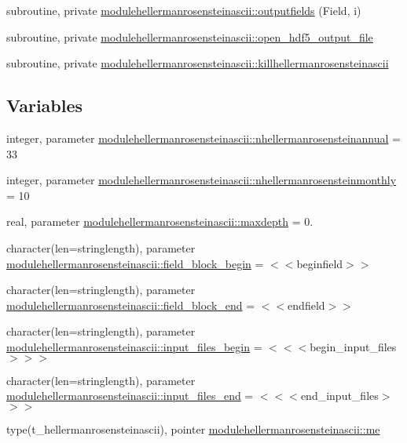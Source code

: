 \begin{DoxyCompactItemize}
\item 
subroutine, private \mbox{\hyperlink{namespacemodulehellermanrosensteinascii_ab76e43d5b0134daf9106f606a088cbea}{modulehellermanrosensteinascii\+::outputfields}} (Field, i)
\item 
subroutine, private \mbox{\hyperlink{namespacemodulehellermanrosensteinascii_a7fa8f1b341c583ddb13cecd1d05b9e77}{modulehellermanrosensteinascii\+::open\+\_\+hdf5\+\_\+output\+\_\+file}}
\item 
subroutine, private \mbox{\hyperlink{namespacemodulehellermanrosensteinascii_a2350c23791f119cd18bfa9a4e532508c}{modulehellermanrosensteinascii\+::killhellermanrosensteinascii}}
\end{DoxyCompactItemize}
\subsection*{Variables}
\begin{DoxyCompactItemize}
\item 
integer, parameter \mbox{\hyperlink{namespacemodulehellermanrosensteinascii_a7c99a3c54379548ef0084208ccd395ed}{modulehellermanrosensteinascii\+::nhellermanrosensteinannual}} = 33
\item 
integer, parameter \mbox{\hyperlink{namespacemodulehellermanrosensteinascii_adc90d7846e6bfeced43dc1391d5e90aa}{modulehellermanrosensteinascii\+::nhellermanrosensteinmonthly}} = 10
\item 
real, parameter \mbox{\hyperlink{namespacemodulehellermanrosensteinascii_a7ea7fe95271e22acb6cd18f683d4534d}{modulehellermanrosensteinascii\+::maxdepth}} = 0.
\item 
character(len=stringlength), parameter \mbox{\hyperlink{namespacemodulehellermanrosensteinascii_a9d8b6c5990fab9e4ad7cbaf10b3f7c09}{modulehellermanrosensteinascii\+::field\+\_\+block\+\_\+begin}} = \textquotesingle{}$<$$<$beginfield$>$$>$\textquotesingle{}
\item 
character(len=stringlength), parameter \mbox{\hyperlink{namespacemodulehellermanrosensteinascii_ae2ddb5d68a2e480ae833622c57c64662}{modulehellermanrosensteinascii\+::field\+\_\+block\+\_\+end}} = \textquotesingle{}$<$$<$endfield$>$$>$\textquotesingle{}
\item 
character(len=stringlength), parameter \mbox{\hyperlink{namespacemodulehellermanrosensteinascii_a84784306a25f21f72365989672906eb5}{modulehellermanrosensteinascii\+::input\+\_\+files\+\_\+begin}} = \textquotesingle{}$<$$<$$<$begin\+\_\+input\+\_\+files$>$$>$$>$\textquotesingle{}
\item 
character(len=stringlength), parameter \mbox{\hyperlink{namespacemodulehellermanrosensteinascii_a604227d6abb2c39231e3fb75fd63921f}{modulehellermanrosensteinascii\+::input\+\_\+files\+\_\+end}} = \textquotesingle{}$<$$<$$<$end\+\_\+input\+\_\+files$>$$>$$>$\textquotesingle{}
\item 
type(t\+\_\+hellermanrosensteinascii), pointer \mbox{\hyperlink{namespacemodulehellermanrosensteinascii_af64aed3a69e42f0736c203774d0783c9}{modulehellermanrosensteinascii\+::me}}
\end{DoxyCompactItemize}
